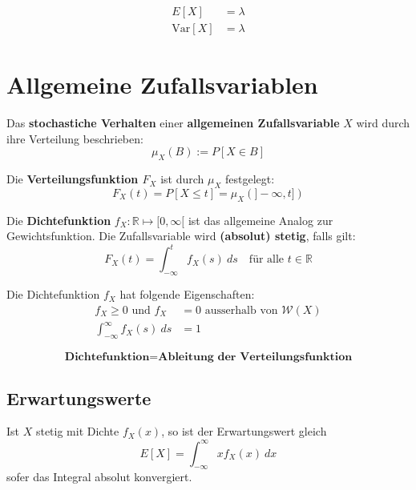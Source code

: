 \documentclass[11pt]{article}
\newcommand{\Var}{\text{Var}}
\begin{document}
\begin{equation*}
\begin{split}
	E[X] & = \lambda \\
	\Var[X] & = \lambda
\end{split}
\end{equation*}

\section{Allgemeine Zufallsvariablen}

Das \textbf{stochastiche Verhalten} einer \textbf{allgemeinen Zufallsvariable} $X$ wird durch ihre Verteilung beschrieben:
\begin{equation*}
	\mu_X(B) := P[X \in B] 
\end{equation*}

Die \textbf{Verteilungsfunktion $F_X$} ist durch $\mu_X$ festgelegt:
\begin{equation*}
	F_X(t) = P[X \leq t] = \mu_X(]-\infty,t])
\end{equation*}

Die \textbf{Dichtefunktion} $f_X: \mathbb{R} \mapsto [0,\infty[$ ist das allgemeine Analog zur Gewichtsfunktion. Die Zufallsvariable wird \textbf{(absolut) stetig}, falls gilt:
\begin{equation*}
	F_X(t) = \int_{-\infty}^t f_X(s)\ ds \quad\text{f{\"u}r alle }t\in \mathbb{R}
\end{equation*}

Die Dichtefunktion $f_X$ hat folgende Eigenschaften:
\begin{equation*}
\begin{split}
	f_X \geq 0 \text{ und } f_X & = 0\text{ ausserhalb von } \mathcal{W}(X) \\
	\int_{-\infty}^\infty f_X(s)\ ds & = 1
\end{split}
\end{equation*}

\begin{equation*}
	\textbf{Dichtefunktion} = \textbf{Ableitung der Verteilungsfunktion}
\end{equation*}

\subsection{Erwartungswerte}

Ist $X$ stetig mit Dichte $f_X(x)$, so ist der Erwartungswert gleich
\begin{equation*}
	E[X] = \int_{-\infty}^\infty x f_X(x)\ dx
\end{equation*}
sofer das Integral absolut konvergiert.
\end{document}
